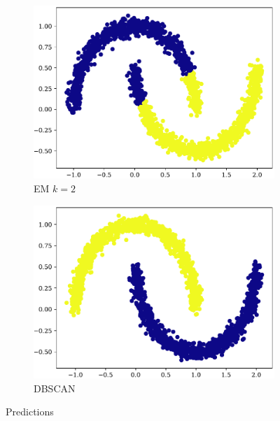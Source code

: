 \begin{figure}[t!]
\begin{subfigure}[b]{0.45\textwidth}
        \includegraphics[width=\textwidth]{../plots/moons_em.pdf}
        \caption{EM $k = 2$}
        \label{subfig:moon-em}
    \end{subfigure}
    \hspace{0.09\textwidth}
    \begin{subfigure}[b]{0.45\textwidth}
        \includegraphics[width=\textwidth]{../plots/moons_dbscan.pdf}
        \caption{DBSCAN}
        \label{subfig:moon-dbscan}
    \end{subfigure}
    \caption{Predictions}
    \label{fig:pred2}
\end{figure}
